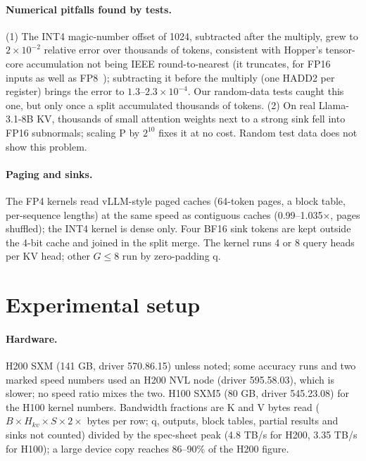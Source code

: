 \documentclass[11pt]{article}
\begin{document}
\paragraph{Numerical pitfalls found by tests.} (1) The INT4 magic-number offset of 1024, subtracted after the multiply, grew to $2\times10^{-2}$ relative error over thousands of tokens, consistent with Hopper's tensor-core accumulation not being IEEE round-to-nearest (it truncates, for FP16 inputs as well as FP8~\cite{khattak2025tensorcores}); subtracting it before the multiply (one HADD2 per register) brings the error to $1.3$--$2.3\times10^{-4}$. Our random-data tests caught this one, but only once a split accumulated thousands of tokens. (2) On real Llama-3.1-8B KV, thousands of small attention weights next to a strong sink fell into FP16 subnormals; scaling P by $2^{10}$ fixes it at no cost. Random test data does not show this problem.

\paragraph{Paging and sinks.} The FP4 kernels read vLLM-style paged caches (64-token pages, a block table, per-sequence lengths) at the same speed as contiguous caches (0.99--1.035$\times$, pages shuffled); the INT4 kernel is dense only. Four BF16 sink tokens are kept outside the 4-bit cache and joined in the split merge. The kernel runs 4 or 8 query heads per KV head; other $G \leq 8$ run by zero-padding q.

\section{Experimental setup}
\label{sec:setup}

\paragraph{Hardware.} H200 SXM (141 GB, driver 570.86.15) unless noted; some accuracy runs and two marked speed numbers used an H200 NVL node (driver 595.58.03), which is slower; no speed ratio mixes the two. H100 SXM5 (80 GB, driver 545.23.08) for the H100 kernel numbers. Bandwidth fractions are K and V bytes read ($B \times H_{kv} \times S \times 2 \times$ bytes per row; q, outputs, block tables, partial results and sinks not counted) divided by the spec-sheet peak (4.8 TB/s for H200, 3.35 TB/s for H100); a large device copy reaches 86--90\% of the H200 figure.
\end{document}

